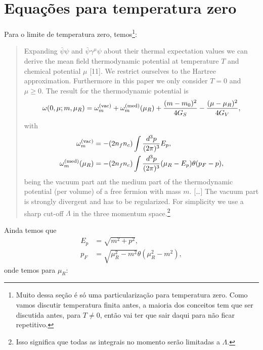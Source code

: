 \section{Equações para temperatura zero}

Para o limite de temperatura zero, temos\cite{Buballa1996}\footnote{Muito dessa seção é só uma particularização para temperatura zero. Como vamos discutir temperatura finita antes, a maioria dos conceitos tem que ser discutida antes, para $T \neq 0$, então vai ter que sair daqui para não ficar repetitivo.}:
\begin{quote}
Expanding $\bar{\psi}\psi$ and $\bar{\psi}\gamma^\mu\psi$ about their thermal expectation values we can derive the mean field thermodynamic potential at temperature $T$ and chemical potential $\mu$ [11]. We restrict ourselves to the Hartree approximation. Furthermore in this paper we only consider $T=0$ and $\mu \geqslant 0$. The result for the thermodynamic potential is
\begin{equation}\label{Eq:Def_pot_termo}
	\omega(0,\mu; m, \mu_R) = \omega_m^{\rm{(vac)}} + \omega_m^{\rm{(med)}}(\mu_R) + \frac{(m - m_0)^2}{4G_S} - \frac{(\mu - \mu_R)^2}{4G_V},
\end{equation}
%
with
\begin{align}
	\omega_m^{\rm{(vac)}} &= - (2n_fn_c) \int \frac{d^3p}{(2\pi)^3} E_p, \label{Eq:Def_omega_vac}\\
	\omega_m^{\rm{(med)}}(\mu_R) &= - (2n_fn_c) \int \frac{d^3p}{(2\pi)^3}(\mu_R - E_p)\theta(p_F - p), \label{Eq:Def_omega_med}
\end{align}
%
being the vacuum part ant the medium part of the thermodynamic potential (per volume) of a free fermion with mass $m$. [\dots] The vacuum part is strongly divergent and has to be regularized. For simplicity we use a sharp cut-off $\Lambda$ in the three momentum space.\footnote{Isso significa que todas as integrais no momento serão limitadas a $\Lambda$.}
\end{quote}
%
Ainda temos que
\begin{align}
	E_p &= \sqrt{m^2+p^2}, \label{Eq:Def_E}\\
	p_F &= \sqrt{\mu_R^2 - m^2}\theta(\mu_R^2 - m^2), \label{Eq:Rel_pot_quim_renorm_mom_fermi}
\end{align}
%
onde temos para $\mu_R$:

